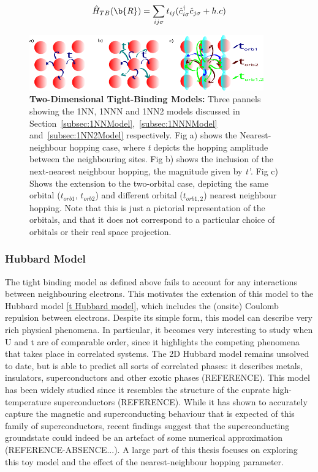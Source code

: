 \documentclass[12pt]{article}
\begin{document}
\begin{equation} \label{TBM}
    \hat{H}_{TB}(\b{R}) = \sum_{ij\sigma} t_{ij}(\hat{c}_{i\sigma}^{\dagger}\hat{c}_{j \sigma} + h.c)
\end{equation}


\begin{figure}[htbp]  %
    \centering
    \includegraphics[width=0.9\textwidth]{2Dhubbardmodel.png}  %
    \caption{\textbf{Two-Dimensional Tight-Binding Models:} Three pannels showing the 1NN, 1NNN and 1NN2 models discussed in Section~\ref{subsec:1NNModel},~\ref{subsec:1NNNModel} and~\ref{subsec:1NN2Model} respectively. Fig a) shows the Nearest-neighbour hopping case, where \textit{t} depicts the hopping amplitude between the neighbouring sites. Fig b) shows the inclusion of the next-nearest neighbour hopping, the magnitude given by \textit{t'}.
    Fig c) Shows the extension to the two-orbital case, depicting the same orbital ($t_{orb1}$, $t_{orb2}$) and different orbital ($t_{orb1,2}$) nearest neighbour hopping. Note that this is just a pictorial representation of the orbitals, and that it does not correspond to a particular choice of orbitals or their real space projection. }
    \label{fig:2D Hubbard model}
\end{figure}

\newpage

\subsubsection{Hubbard Model}
\label{subsec: HubbardModel}

The  tight binding model as defined above fails to account for any interactions between neighbouring electrons. This motivates the extension of this model to the Hubbard model \eqref{t Hubbard model}, which includes the (onsite) Coulomb repulsion between electrons. Despite its simple form, this model can describe very rich physical phenomena.
In particular, it becomes very interesting to study when U and t are of comparable order, since it highlights the competing phenomena that takes place in correlated systems. 
The 2D Hubbard model remains unsolved to date, but is able to predict all sorts of correlated phases: it describes metals, insulators, superconductors and other exotic phases (REFERENCE). 
This model has been widely studied since it resembles the structure of the cuprate high-temperature superconductors (REFERENCE). While it has shown to accurately  capture the magnetic and superconducting behaviour that is expected of this family of superconductors, recent findings suggest that the superconducting groundstate 
could indeed be an artefact of some numerical approximation (REFERENCE-ABSENCE...). A large part of this thesis focuses on exploring this toy model and the effect of the nearest-neighbour hopping parameter.
\end{document}
